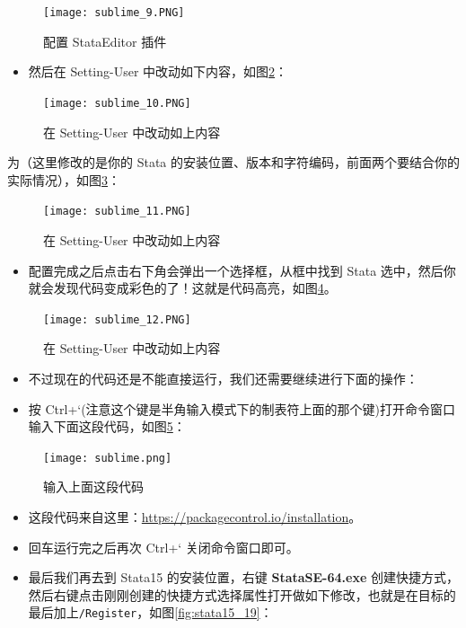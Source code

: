 \documentclass[cn,fancy,blue,11pt]{elegantbook}
\begin{document}
\begin{figure}[htbp]
  \centering
  \texttt{[image: sublime\_9.PNG]}
  \caption{配置 StataEditor 插件}
  \label{fig:sublime_9}
\end{figure}

\begin{itemize}
\item
  然后在 Setting-User 中改动如下内容，如图\ref{fig:sublime_10}：
\end{itemize}

\begin{figure}[htbp]
  \centering
  \texttt{[image: sublime\_10.PNG]}
  \caption{在 Setting-User 中改动如上内容}
  \label{fig:sublime_10}
\end{figure}

为（这里修改的是你的 Stata 的安装位置、版本和字符编码，前面两个要结合你的实际情况），如图\ref{fig:sublime_11}：

\begin{figure}[htbp]
  \centering
  \texttt{[image: sublime\_11.PNG]}
  \caption{在 Setting-User 中改动如上内容}
  \label{fig:sublime_11}
\end{figure}

\begin{itemize}
\item
  配置完成之后点击右下角会弹出一个选择框，从框中找到 Stata 选中，然后你就会发现代码变成彩色的了！这就是代码高亮，如图\ref{fig:sublime_12}。
\end{itemize}

\begin{figure}[htbp]
  \centering
  \texttt{[image: sublime\_12.PNG]}
  \caption{在 Setting-User 中改动如上内容}
  \label{fig:sublime_12}
\end{figure}

\begin{itemize}
\item
  不过现在的代码还是不能直接运行，我们还需要继续进行下面的操作：
\item
  按 Ctrl+`(注意这个键是半角输入模式下的制表符上面的那个键)打开命令窗口输入下面这段代码，如图\ref{fig:sublime}：
\end{itemize}

\begin{figure}[htbp]
  \centering
  \texttt{[image: sublime.png]}
  \caption{输入上面这段代码}
  \label{fig:sublime}
\end{figure}

\begin{itemize}
\item
  这段代码来自这里：\url{https://packagecontrol.io/installation}。
\item
  回车运行完之后再次 Ctrl+` 关闭命令窗口即可。
\item
  最后我们再去到 Stata15 的安装位置，右键 \textbf{StataSE-64.exe} 创建快捷方式，然后右键点击刚刚创建的快捷方式选择属性打开做如下修改，也就是在目标的最后加上\lstinline{/Register}，如图\ref{fig:stata15_19}：
\end{itemize}
\end{document}
